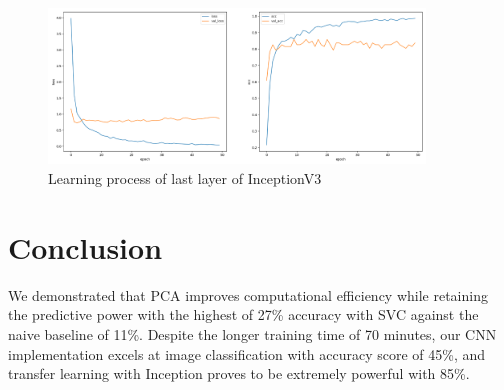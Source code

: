\documentclass[11pt,titlepage,oneside,openany]{article}
\begin{document}
\begin{figure}[h]
	\centering
	\includegraphics[width=10cm]{learning2}
	\caption{Learning process of last layer of InceptionV3}
	\label{fig:learn2}
\end{figure}

\section{Conclusion}
We demonstrated that PCA improves computational efficiency while retaining the predictive power with the highest of 27\% accuracy with SVC against the naive baseline of 11\%. Despite the longer training time of 70 minutes, our CNN implementation excels at image classification with accuracy score of 45\%, and transfer learning with Inception proves to be extremely powerful with 85\%.

\newpage



\end{document}
